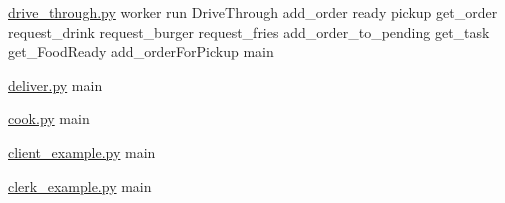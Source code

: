 \mbox{\hyperlink{drive__through_8py}{drive\+\_\+through.\+py}} worker run Drive\+Through add\+\_\+order ready pickup get\+\_\+order request\+\_\+drink request\+\_\+burger request\+\_\+fries add\+\_\+order\+\_\+to\+\_\+pending get\+\_\+task get\+\_\+\+Food\+Ready add\+\_\+order\+For\+Pickup main

\mbox{\hyperlink{deliver_8py}{deliver.\+py}} main

\mbox{\hyperlink{cook_8py}{cook.\+py}} main

\mbox{\hyperlink{client__example_8py}{client\+\_\+example.\+py}} main

\mbox{\hyperlink{clerk__example_8py}{clerk\+\_\+example.\+py}} main 